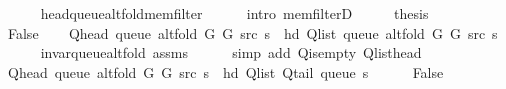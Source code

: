 \begin{isabellebody}
\ \ \ \ \isamarkupfalse%
\ head{\isacharunderscore}{\kern0pt}queue{\isacharunderscore}{\kern0pt}alt{\isacharunderscore}{\kern0pt}fold{\isacharunderscore}{\kern0pt}mem{\isacharunderscore}{\kern0pt}filter\isanewline
\ \ \ \ \isamarkupfalse%
\ {\isacharparenleft}{\kern0pt}intro\ mem{\isacharunderscore}{\kern0pt}filterD{\isacharparenleft}{\kern0pt}{}{\isacharparenright}{\kern0pt}{\isacharparenright}{\kern0pt}\isanewline
\ \ \isamarkupfalse%
\ \isamarkupfalse%
\ {\isacharquery}{\kern0pt}thesis\isanewline
\ \ \ \ \isacommand{{\isachardot}{\kern0pt}}\isamarkupfalse%
\isanewline
{}\isamarkupfalse%
\isanewline
\ \ \isamarkupfalse%
\ False\isanewline
\ \ \isamarkupfalse%
\ {\isachardoublequoteopen}Q{\isacharunderscore}{\kern0pt}head\ {\isacharparenleft}{\kern0pt}queue\ {\isacharparenleft}{\kern0pt}alt{\isacharunderscore}{\kern0pt}fold\ G{}\ G{}\ src\ s{\isacharparenright}{\kern0pt}{\isacharparenright}{\kern0pt}\ {\isacharequal}{\kern0pt}\ hd\ {\isacharparenleft}{\kern0pt}Q{\isacharunderscore}{\kern0pt}list\ {\isacharparenleft}{\kern0pt}queue\ {\isacharparenleft}{\kern0pt}alt{\isacharunderscore}{\kern0pt}fold\ G{}\ G{}\ src\ s{\isacharparenright}{\kern0pt}{\isacharparenright}{\kern0pt}{\isacharparenright}{\kern0pt}{\isachardoublequoteclose}\isanewline
\ \ \ \ \isamarkupfalse%
\ invar{\isacharunderscore}{\kern0pt}queue{\isacharunderscore}{\kern0pt}alt{\isacharunderscore}{\kern0pt}fold\ assms\isanewline
\ \ \ \ \isamarkupfalse%
\ {\isacharparenleft}{\kern0pt}simp\ add{\isacharcolon}{\kern0pt}\ Q{\isachardot}{\kern0pt}is{\isacharunderscore}{\kern0pt}empty\ Q{\isachardot}{\kern0pt}list{\isacharunderscore}{\kern0pt}head{\isacharparenright}{\kern0pt}\isanewline
\ \ \isamarkupfalse%
\ {\isachardoublequoteopen}Q{\isacharunderscore}{\kern0pt}head\ {\isacharparenleft}{\kern0pt}queue\ {\isacharparenleft}{\kern0pt}alt{\isacharunderscore}{\kern0pt}fold\ G{}\ G{}\ src\ s{\isacharparenright}{\kern0pt}{\isacharparenright}{\kern0pt}\ {\isacharequal}{\kern0pt}\ hd\ {\isacharparenleft}{\kern0pt}Q{\isacharunderscore}{\kern0pt}list\ {\isacharparenleft}{\kern0pt}Q{\isacharunderscore}{\kern0pt}tail\ {\isacharparenleft}{\kern0pt}queue\ s{\isacharparenright}{\kern0pt}{\isacharparenright}{\kern0pt}{\isacharparenright}{\kern0pt}{\isachardoublequoteclose}\isanewline
\ \ \ \ \isamarkupfalse%
\ False\isanewline
\ \ \ \ \isamarkupfalse%

\end{isabellebody}

